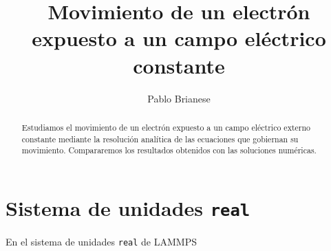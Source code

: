 \documentclass{article}
\title{Movimiento de un electrón expuesto a un campo eléctrico constante}
\author{Pablo Brianese}
\begin{document}
  \maketitle
  \begin{abstract}
    Estudiamos el movimiento de un electrón expuesto a un campo eléctrico externo constante mediante la resolución analítica de las ecuaciones que gobiernan su movimiento.
    Compararemos los resultados obtenidos con las soluciones numéricas.  
  \end{abstract}

  \section{Sistema de unidades \texttt{real}}

  En el sistema de unidades \texttt{real} de LAMMPS
\end{document}

